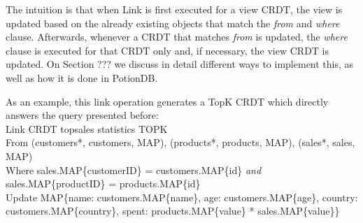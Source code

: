 \documentclass{vldb}
\begin{document}
The intuition is that when Link is first executed for a view CRDT, the view is updated based on the already existing objects that match the \emph{from} and \emph{where} clause.
Afterwards, whenever a CRDT that matches \emph{from} is updated, the \emph{where} clause is executed for that CRDT only and, if necessary, the view CRDT is updated.
On Section ??? we discuss in detail different ways to implement this, as well as how it is done in PotionDB. %

As an example, this link operation generates a TopK CRDT which directly answers the query presented before:
\\
Link CRDT topsales statistics TOPK \\
From (customers*, customers, MAP), (products*, products, MAP), (sales*, sales, MAP) \\
Where sales.MAP\{customerID\} = customers.MAP\{id\} \emph{and}  sales.MAP\{productID\} = products.MAP\{id\} \\
Update MAP\{name: customers.MAP\{name\}, age: customers.MAP\{age\}, country: customers.MAP\{country\}, spent: products.MAP\{value\} * sales.MAP\{value\}\} \\

\null\newpage\null

\null\newpage\null
\end{document}
